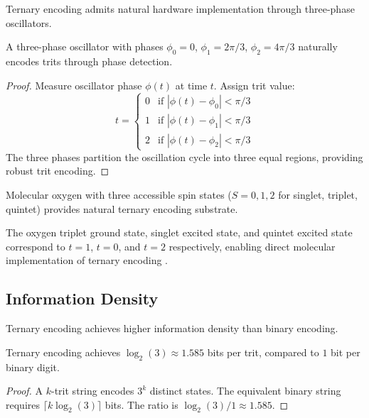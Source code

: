 Ternary encoding admits natural hardware implementation through three-phase oscillators.

\begin{proposition}
A three-phase oscillator with phases $\phi_0 = 0$, $\phi_1 = 2\pi/3$, $\phi_2 = 4\pi/3$ naturally encodes trits through phase detection.
\end{proposition}

\begin{proof}
Measure oscillator phase $\phi(t)$ at time $t$. Assign trit value:
\begin{equation}
t = \begin{cases}
0 & \text{if } |\phi(t) - \phi_0| < \pi/3 \\
1 & \text{if } |\phi(t) - \phi_1| < \pi/3 \\
2 & \text{if } |\phi(t) - \phi_2| < \pi/3
\end{cases}
\end{equation}
The three phases partition the oscillation cycle into three equal regions, providing robust trit encoding.
\end{proof}

\begin{corollary}
Molecular oxygen with three accessible spin states ($S = 0, 1, 2$ for singlet, triplet, quintet) provides natural ternary encoding substrate.
\end{corollary}

The oxygen triplet ground state, singlet excited state, and quintet excited state correspond to $t = 1$, $t = 0$, and $t = 2$ respectively, enabling direct molecular implementation of ternary encoding \citep{herzberg1950molecular}.

\subsection{Information Density}

Ternary encoding achieves higher information density than binary encoding.

\begin{proposition}
Ternary encoding achieves $\log_2(3) \approx 1.585$ bits per trit, compared to $1$ bit per binary digit.
\end{proposition}

\begin{proof}
A $k$-trit string encodes $3^k$ distinct states. The equivalent binary string requires $\lceil k \log_2(3) \rceil$ bits. The ratio is $\log_2(3)/1 \approx 1.585$.
\end{proof}


